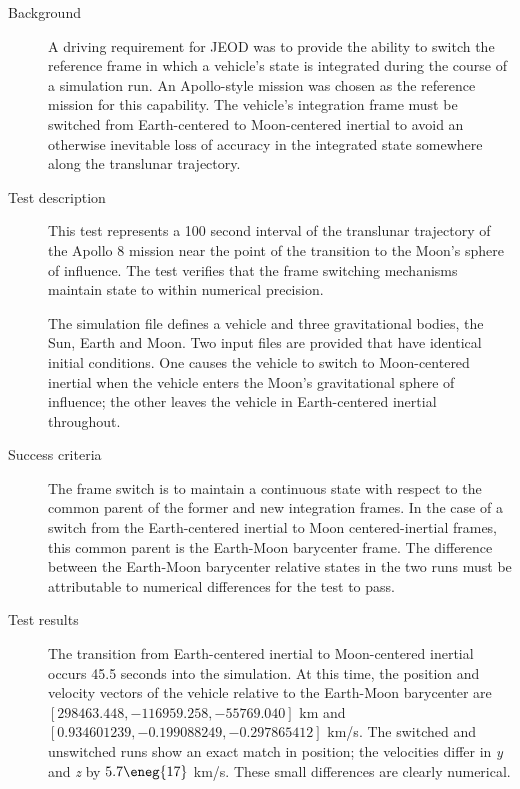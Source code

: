 \label{test:DynBodyFrameSwitch:frame_switch}
\begin{description}
\item[Background]
A driving requirement for JEOD was to provide the ability to switch the
reference frame in which a vehicle's state is integrated during the course of a
simulation run. An Apollo-style mission was chosen as the reference mission for
this capability. The vehicle's integration frame must be switched from
Earth-centered to Moon-centered inertial to avoid an otherwise inevitable loss of
accuracy in the integrated state somewhere along the translunar trajectory.

\item[Test description]
This test represents a 100 second interval of the translunar trajectory of the
Apollo 8 mission near the point of the transition to the Moon's sphere of
influence. The test verifies that the frame switching mechanisms maintain state
to within numerical precision.

The simulation \Sdefine file defines a vehicle and three gravitational bodies,
the Sun, Earth and Moon. Two input files are provided that
have identical initial conditions. One
causes the vehicle to switch to Moon-centered inertial
when the vehicle enters the Moon's gravitational sphere of influence;
the other leaves the vehicle in Earth-centered inertial throughout.

\item[Success criteria]
The frame switch is to maintain a continuous state with respect to the common
parent of the former and new integration frames. In the case of a switch from
the Earth-centered inertial to Moon centered-inertial frames, this common
parent is the Earth-Moon barycenter frame. The difference between the Earth-Moon
barycenter relative states in the two runs must be attributable to numerical
differences for the test to pass.

\item[Test results]
The transition from Earth-centered inertial to Moon-centered inertial occurs 45.5
seconds into the simulation. At this time, the position and velocity vectors of
the vehicle relative to the Earth-Moon barycenter are
$[298463.448, -116959.258, -55769.040]$ km and
$[0.934601239, -0.199088249, -0.297865412]$ km/s.
The switched and unswitched runs show an exact match in position;
the velocities differ in {\emph y} and {\emph z} by $5.7\eneg{17}$ km/s.
These small differences are clearly numerical.


\end{description}
